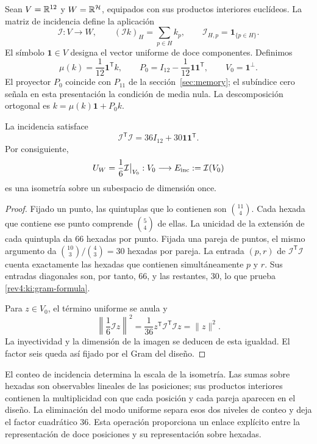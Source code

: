 Sean \(V=\mathbb R^{12}\) y \(W=\mathbb R^{\mathcal H}\), equipados con
sus productos interiores euclídeos. La matriz de incidencia define
la aplicación
\begin{equation}
 \mathcal I:V\longrightarrow W,
 \qquad (\mathcal I k)_H=\sum_{p\in H}k_p,
 \qquad \mathcal I_{H,p}=\mathbf1_{\{p\in H\}}.
 \label{rev4:ki:incidence-map}
\end{equation}
El símbolo \(\mathbf1\in V\) designa el vector uniforme de doce
componentes. Definimos
\[
 \mu(k)=\frac1{12}\mathbf1^{\mathsf T}k,\qquad
 P_0=I_{12}-\frac1{12}\mathbf1\mathbf1^{\mathsf T},\qquad
 V_0=\mathbf1^\perp.
\]
El proyector \(P_0\) coincide con \(P_{11}\) de la
sección~\ref{sec:memory}; el subíndice cero señala en esta
presentación la condición de media nula. La descomposición ortogonal
es \(k=\mu(k)\mathbf1+P_0k\).

\begin{lemma}
\label{rev4:ki:gram}
La incidencia satisface
\begin{equation}
 \mathcal I^{\mathsf T}\mathcal I
       =36I_{12}+30\mathbf1\mathbf1^{\mathsf T}.
 \label{rev4:ki:gram-formula}
\end{equation}
Por consiguiente,
\[
 U_W=\frac16\mathcal I\big|_{V_0}:
 V_0\longrightarrow E_{\rm inc}:=\mathcal I(V_0)
\]
es una isometría sobre un subespacio de dimensión once.
\end{lemma}
\begin{proof}
Fijado un punto, las quintuplas que lo contienen son
\(\binom{11}{4}\). Cada hexada que contiene ese punto comprende
\(\binom54\) de ellas. La unicidad de la extensión de cada
quintupla da \(66\) hexadas por punto. Fijada una pareja de
puntos, el mismo argumento da
\(\binom{10}{3}/\binom43=30\) hexadas por pareja.
La entrada \((p,r)\) de
\(\mathcal I^{\mathsf T}\mathcal I\) cuenta exactamente las
hexadas que contienen simultáneamente \(p\) y \(r\). Sus
entradas diagonales son, por tanto, \(66\), y las restantes,
\(30\), lo que prueba \eqref{rev4:ki:gram-formula}.

Para \(z\in V_0\), el término uniforme se anula y
\[
 \left\|\frac16\mathcal I z\right\|^2
 =\frac1{36}z^{\mathsf T}
       \mathcal I^{\mathsf T}\mathcal I z
 =\|z\|^2.
\]
La inyectividad y la dimensión de la imagen se deducen de esta
igualdad. El factor seis queda así fijado por el Gram del diseño.
\end{proof}

El conteo de incidencia determina la escala de la isometría. Las
sumas sobre hexadas son observables lineales de las posiciones; sus
productos interiores contienen la multiplicidad con que cada
posición y cada pareja aparecen en el diseño. La eliminación del
modo uniforme separa esos dos niveles de conteo y deja el factor
cuadrático \(36\). Esta operación proporciona un enlace explícito
entre la representación de doce posiciones y su representación
sobre hexadas.

